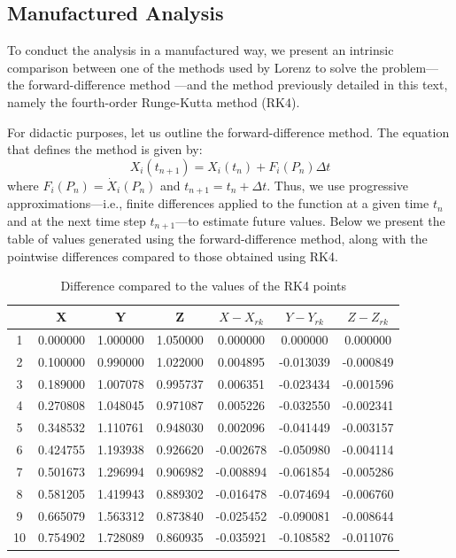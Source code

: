 \documentclass[12pt, a4paper]{article}
\begin{document}
	\subsection{Manufactured Analysis}
	
	To conduct the analysis in a manufactured way, we present an intrinsic comparison between one of the methods used by Lorenz to solve the problem—the forward-difference method \cite{Lorenz1963}—and the method previously detailed in this text, namely the fourth-order Runge-Kutta method (RK4).
	
	For didactic purposes, let us outline the forward-difference method. The equation that defines the method is given by:
	\begin{equation*}
		X_i(t_{n+1}) = X_i(t_n) + F_i(P_n)\Delta t
	\end{equation*}
	where $F_i(P_n) = \dot X_i(P_n)$ and $t_{n+1} = t_n + \Delta t$. Thus, we use progressive approximations—i.e., finite differences applied to the function at a given time $t_n$ and at the next time step $t_{n+1}$—to estimate future values. Below we present the table of values generated using the forward-difference method, along with the pointwise differences compared to those obtained using RK4.
	
	    
	\begin{table}[H]
		\centering
		\begin{tabular}{|c|c|c|c|c|c|c|}
			\hline
			   & X        & Y        & Z        & $X-X_{rk}$ & $Y-Y_{rk}$ & $Z-Z_{rk}$ \\
			\hline
			1  & 0.000000 & 1.000000 & 1.050000 & 0.000000   & 0.000000   & 0.000000   \\
			2  & 0.100000 & 0.990000 & 1.022000 & 0.004895   & -0.013039  & -0.000849  \\
			3  & 0.189000 & 1.007078 & 0.995737 & 0.006351   & -0.023434  & -0.001596  \\
			4  & 0.270808 & 1.048045 & 0.971087 & 0.005226   & -0.032550  & -0.002341  \\
			5  & 0.348532 & 1.110761 & 0.948030 & 0.002096   & -0.041449  & -0.003157  \\
			6  & 0.424755 & 1.193938 & 0.926620 & -0.002678  & -0.050980  & -0.004114  \\
			7  & 0.501673 & 1.296994 & 0.906982 & -0.008894  & -0.061854  & -0.005286  \\
			8  & 0.581205 & 1.419943 & 0.889302 & -0.016478  & -0.074694  & -0.006760  \\
			9  & 0.665079 & 1.563312 & 0.873840 & -0.025452  & -0.090081  & -0.008644  \\
			10 & 0.754902 & 1.728089 & 0.860935 & -0.035921  & -0.108582  & -0.011076  \\
			\hline
		\end{tabular}
		\caption{Difference compared to the values of the RK4 points}
		\label{tab:rk44-diff}
	\end{table}
\end{document}
